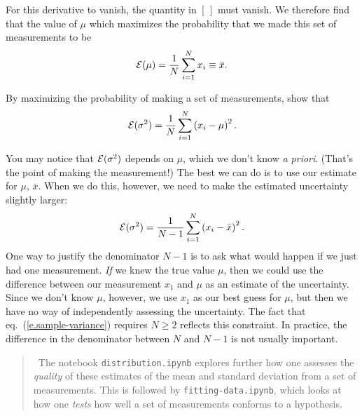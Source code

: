 For this derivative to vanish, the quantity in $\left[\,\right]$ must vanish.
We therefore find that the value of $\mu$ which maximizes the probability that we made this set of measurements to be
\begin{equation}
	\mathcal{E}(\mu) = \frac{1}{N}\sum_{i=1}^{N}x_{i} \equiv \bar{x}.
\end{equation}
\begin{exercisebox}
By maximizing the probability of making a set of measurements, show that
\[
 \mathcal{E}(\sigma^{2}) = \frac{1}{N}\sum_{i=1}^{N}\left(x_{i}-\mu\right)^{2}.
\]
\end{exercisebox}

You may notice that $\mathcal{E}(\sigma^{2})$ depends on $\mu$, which we don't know \emph{a priori}. (That's the point of making the measurement!) The best we can do is to use our estimate for $\mu$, $\bar{x}$. When we do this, however, we need to make the estimated uncertainty slightly larger:
\begin{equation}\label{e.sample-variance}
\mathcal{E}(\sigma^{2}) = \frac{1}{N-1}\sum_{i=1}^{N}\left(x_{i}-\bar{x}\right)^{2}.
\end{equation}
One way to justify the denominator $N-1$ is to ask what would happen if we just had one measurement. \emph{If} we knew the true value $\mu$, then we could use the difference between our measurement $x_{1}$ and $\mu$ as an estimate of the uncertainty. Since we don't know $\mu$, however, we use $x_{1}$ as our best guess for $\mu$, but then we have no way of independently assessing the uncertainty. The fact that eq.~(\ref{e.sample-variance}) requires $N\ge 2$ reflects this constraint.
In practice, the difference in the denominator between $N$ and $N-1$ is not usually important.

\begin{quote}
\notebook\ The notebook \texttt{distribution.ipynb} explores further how one assesses the \emph{quality} of these estimates of the mean and standard deviation from a set of measurements. This is followed by \texttt{fitting-data.ipynb}, which looks at how one \emph{tests} how well a set of measurements conforms to a hypothesis.
\end{quote}

